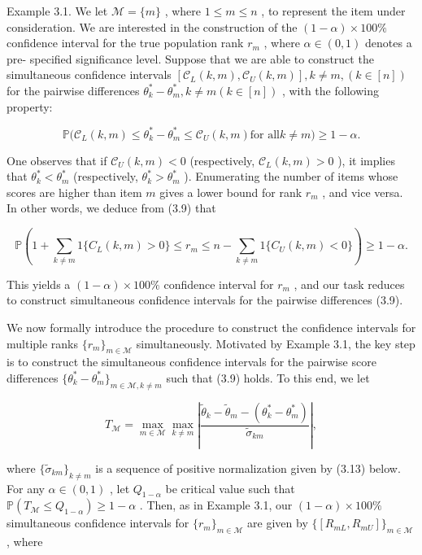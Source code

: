 Example 3.1. We let \(\mathcal{M} = \{m\}\) , where \(1 \leq m \leq n\)
, to represent the item under consideration. We are interested in the
construction of the \((1 - \alpha) \times 100\%\) confidence interval
for the true population rank \(r_{m}\) , where \(\alpha \in (0,1)\)
denotes a pre- specified significance level. Suppose that we are able to
construct the simultaneous confidence intervals
\([\mathcal{C}_L(k,m), \mathcal{C}_U(k,m)], k \neq m, (k \in [n])\) for
the pairwise differences
\(\theta_{k}^{*} - \theta_{m}^{*}, k \neq m (k \in [n])\) , with the
following property:

\[
\mathbb{P}\Big(\mathcal{C}_L(k,m) \leq \theta_k^* - \theta_m^* \leq \mathcal{C}_U(k,m) \text{for all} k \neq m\Big) \geq 1 - \alpha . \tag{3.9}
\]

One observes that if \(\mathcal{C}_U(k,m) < 0\) (respectively,
\(\mathcal{C}_L(k,m) > 0\) ), it implies that
\(\theta_k^* < \theta_m^*\) (respectively, \(\theta_k^* > \theta_m^*\)
). Enumerating the number of items whose scores are higher than item
\(m\) gives a lower bound for rank \(r_{m}\) , and vice versa. In other
words, we deduce from (3.9) that

\[
\mathbb{P}\left(1 + \sum_{k \neq m} 1 \{C_L(k,m) > 0\} \leq r_m \leq n - \sum_{k \neq m} 1 \{C_U(k,m) < 0\}\right) \geq 1 - \alpha . \tag{3.10}
\]

This yields a \((1 - \alpha) \times 100\%\) confidence interval for
\(r_{m}\) , and our task reduces to construct simultaneous confidence
intervals for the pairwise differences (3.9).

We now formally introduce the procedure to construct the confidence
intervals for multiple ranks \(\{r_m\}_{m \in \mathcal{M}}\)
simultaneously. Motivated by Example 3.1, the key step is to construct
the simultaneous confidence intervals for the pairwise score differences
\(\{\theta_k^* - \theta_m^*\}_{m \in \mathcal{M}, k \neq m}\) such that
(3.9) holds. To this end, we let

\[
T_{\mathcal{M}} = \max_{m \in \mathcal{M}} \max_{k \neq m} \left| \frac{\widetilde{\theta}_k - \widetilde{\theta}_m - (\theta_k^* - \theta_m^*)}{\widetilde{\sigma}_{km}} \right|, \tag{3.11}
\]

where \(\{\widetilde{\sigma}_{km}\}_{k \neq m}\) is a sequence of
positive normalization given by (3.13) below. For any
\(\alpha \in (0,1)\) , let \(Q_{1 - \alpha}\) be critical value such
that \(\mathbb{P}(T_{\mathcal{M}} \leq Q_{1 - \alpha}) \geq 1 - \alpha\)
. Then, as in Example 3.1, our \((1 - \alpha) \times 100\%\)
simultaneous confidence intervals for \(\{r_m\}_{m \in \mathcal{M}}\)
are given by \(\{[R_{mL}, R_{mU}] \}_{m \in \mathcal{M}}\) , where


